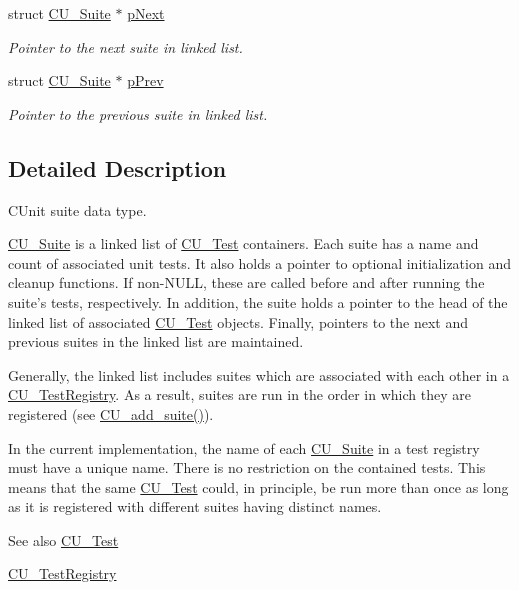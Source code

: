 \begin{DoxyCompactItemize}
struct \hyperlink{struct_c_u___suite}{C\+U\+\_\+\+Suite} $\ast$ \hyperlink{struct_c_u___suite_a695a5eb0087e2d64adc53da4518de69c}{p\+Next}
\begin{DoxyCompactList}\small\item\em Pointer to the next suite in linked list. \end{DoxyCompactList}\item 
struct \hyperlink{struct_c_u___suite}{C\+U\+\_\+\+Suite} $\ast$ \hyperlink{struct_c_u___suite_aa161293fb2ba337e52e1f6c9f5d68448}{p\+Prev}
\begin{DoxyCompactList}\small\item\em Pointer to the previous suite in linked list. \end{DoxyCompactList}\end{DoxyCompactItemize}


\subsection{Detailed Description}
C\+Unit suite data type. 

\hyperlink{struct_c_u___suite}{C\+U\+\_\+\+Suite} is a linked list of \hyperlink{struct_c_u___test}{C\+U\+\_\+\+Test} containers. Each suite has a name and count of associated unit tests. It also holds a pointer to optional initialization and cleanup functions. If non-\/\+N\+U\+L\+L, these are called before and after running the suite's tests, respectively. In addition, the suite holds a pointer to the head of the linked list of associated \hyperlink{struct_c_u___test}{C\+U\+\_\+\+Test} objects. Finally, pointers to the next and previous suites in the linked list are maintained. 

Generally, the linked list includes suites which are associated with each other in a \hyperlink{struct_c_u___test_registry}{C\+U\+\_\+\+Test\+Registry}. As a result, suites are run in the order in which they are registered (see \hyperlink{group___framework_ga94b8f1bbbd93b154a60bb1d43391b48a}{C\+U\+\_\+add\+\_\+suite()}). 

In the current implementation, the name of each \hyperlink{struct_c_u___suite}{C\+U\+\_\+\+Suite} in a test registry must have a unique name. There is no restriction on the contained tests. This means that the same \hyperlink{struct_c_u___test}{C\+U\+\_\+\+Test} could, in principle, be run more than once as long as it is registered with different suites having distinct names. \begin{DoxySeeAlso}{See also}
\hyperlink{struct_c_u___test}{C\+U\+\_\+\+Test} 

\hyperlink{struct_c_u___test_registry}{C\+U\+\_\+\+Test\+Registry} 
\end{DoxySeeAlso}


